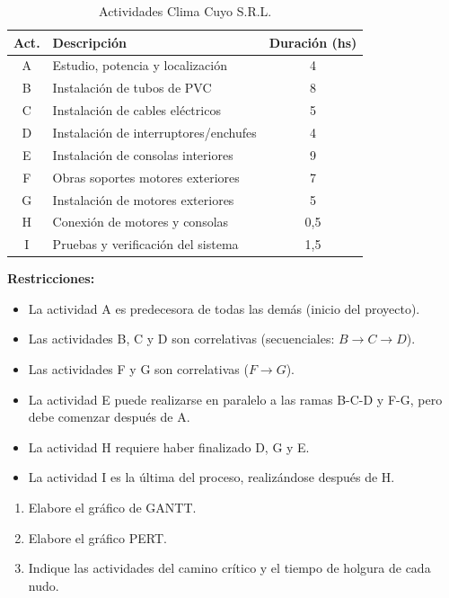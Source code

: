 \documentclass[../main]{subfiles}
\begin{document}
\begin{enumerate}
    \begin{table}[h!]
        \centering
        \begin{tabular}{|c|l|c|} \hline
        \textbf{Act.} & \textbf{Descripción} & \textbf{Duración (hs)} \\ \hline \hline
        A & Estudio, potencia y localización & 4 \\
        B & Instalación de tubos de PVC & 8 \\
        C & Instalación de cables eléctricos & 5 \\
        D & Instalación de interruptores/enchufes & 4 \\
        E & Instalación de consolas interiores & 9 \\
        F & Obras soportes motores exteriores & 7 \\
        G & Instalación de motores exteriores & 5 \\
        H & Conexión de motores y consolas & 0,5 \\
        I & Pruebas y verificación del sistema & 1,5 \\ \hline
        \end{tabular}
        \caption{Actividades Clima Cuyo S.R.L.}
        \label{tab:clima_cuyo}
    \end{table}

    \textbf{Restricciones:}
    \begin{itemize}
        \item La actividad A es predecesora de todas las demás (inicio del proyecto).
        \item Las actividades B, C y D son correlativas (secuenciales: $B \rightarrow C \rightarrow D$).
        \item Las actividades F y G son correlativas ($F \rightarrow G$).
        \item La actividad E puede realizarse en paralelo a las ramas B-C-D y F-G, pero debe comenzar después de A.
        \item La actividad H requiere haber finalizado D, G y E.
        \item La actividad I es la última del proceso, realizándose después de H.
    \end{itemize}

    \begin{enumerate}
       \item Elabore el gráfico de GANTT.
       \item Elabore el gráfico PERT.
       \item Indique las actividades del camino crítico y el tiempo de holgura de cada nudo.
    \end{enumerate}


\end{enumerate}
\end{document}
